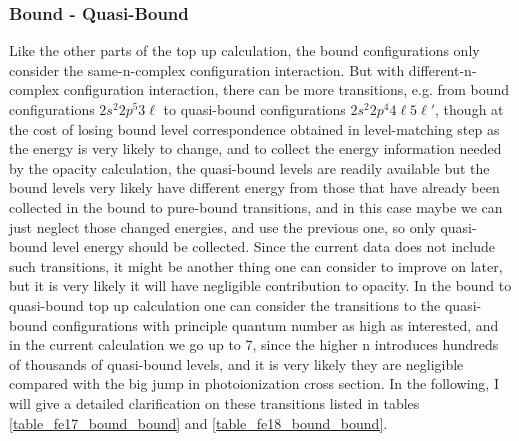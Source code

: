 \subsubsection{Bound - Quasi-Bound}
\label{section_bound_quasi_bound}
Like the other parts of the top up calculation, the bound configurations only consider the same-n-complex configuration interaction. But with different-n-complex configuration interaction, there can be more transitions, e.g. from bound configurations $2s^2 2p^5 3\ell$ to quasi-bound configurations $2s^2 2p^4 4\ell 5\ell'$, though at the cost of losing bound level correspondence obtained in level-matching step as the energy is very likely to change, and to collect the energy information needed by the opacity calculation, the quasi-bound levels are readily available but the bound levels very likely have different energy from those that have already been collected in the bound to pure-bound transitions, and in this case maybe we can just neglect those changed energies, and use the previous one, so only quasi-bound level energy should be collected. Since the current data does not include such transitions, it might be another thing one can consider to improve on later, but it is very likely it will have negligible contribution to opacity. In the bound to quasi-bound top up calculation one can consider the transitions to the quasi-bound configurations with principle quantum number as high as interested, and in the current calculation we go up to 7, since the higher n introduces hundreds of thousands of quasi-bound levels, and it is very likely they are negligible compared with the big jump in photoionization cross section. In the following, I will give a detailed clarification on these transitions listed in tables \ref{table_fe17_bound_bound} and \ref{table_fe18_bound_bound}. 

